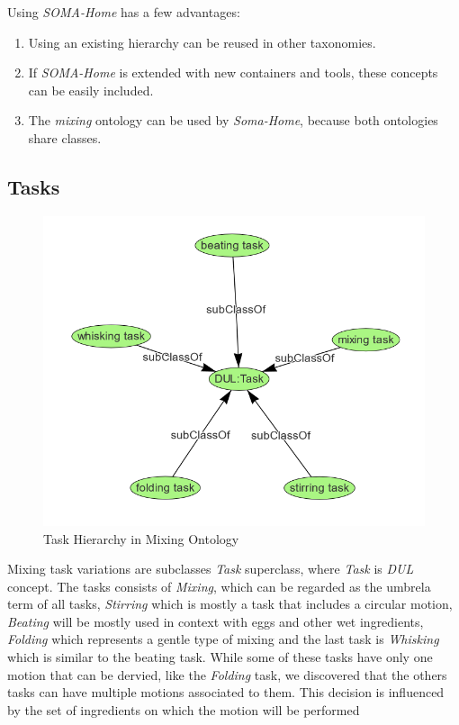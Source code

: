 Using \textit{SOMA-Home} has a few advantages:
\begin{enumerate}
    \item Using an existing hierarchy can be reused in other taxonomies.
    \item If \textit{SOMA-Home} is extended with new containers and tools, these concepts can be easily included.
    \item The \textit{mixing} ontology can be used by \textit{Soma-Home}, because both ontologies share classes.
\end{enumerate}

\subsection{Tasks}

\begin{figure}[H]
    \includegraphics[scale=0.45]{Graphics/classHierarchy/task_hierarchy.png}
    \centering
    \caption{Task Hierarchy in Mixing Ontology}
\end{figure}

Mixing task variations are subclasses \textit{Task} superclass, where \textit{Task} is \textit{DUL} concept. The tasks consists of \textit{Mixing}, which can be regarded as the umbrela term of all tasks, \textit{Stirring} which is mostly a task that includes a circular motion, \textit{Beating} will be mostly used in context with eggs and other wet ingredients, \textit{Folding} which represents a gentle type of mixing and the last task is \textit{Whisking} which is similar to the beating task.
While some of these tasks have only one motion that can be dervied, like the \textit{Folding} task, we discovered that the others tasks can have multiple motions associated to them. This decision is influenced by the set of ingredients on which the motion will be performed

